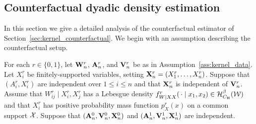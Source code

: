 \subsection{Counterfactual dyadic density estimation}

In this section we give a detailed analysis of the counterfactual
estimator of Section~\ref{sec:kernel_counterfactual}.
We begin with an assumption describing the counterfactual setup.

\begin{assumption}
  \label{ass:kernel_app_counterfactual}

  For each $r \in \{0,1\}$,
  let $\mathbf{W}_n^r$, $\mathbf{A}_n^r$, and $\mathbf{V}_n^r$ be as in
  Assumption~\ref{ass:kernel_data}.
  Let $X_i^r$ be finitely-supported variables,
  setting $\mathbf{X}_n^r = (X_1^r, \ldots, X_n^r)$.
  Suppose that $(A_i^r, X_i^r)$ are
  independent over $1 \leq i \leq n$
  and that $\mathbf{X}_n^r$ is independent of $\mathbf{V}_n^r$.
  Assume that $W_{i j}^r \mid X_i^r, X_j^r$
  has a Lebesgue density
  $f_{W \mid XX}^r(\,\cdot \mid x_1, x_2) \in \mathcal{H}^\beta_{C_{\mathrm{H}}}(\mathcal{W})$
  and that $X_i^r$ has positive
  probability mass function
  $p_X^r(x)$ on a common support $\mathcal{X}$.
  Suppose that
  $(\mathbf{A}_n^0, \mathbf{V}_n^0, \mathbf{X}_n^0)$
  and $(\mathbf{A}_n^1, \mathbf{V}_n^1, \mathbf{X}_n^1)$
  are independent.

\end{assumption}

